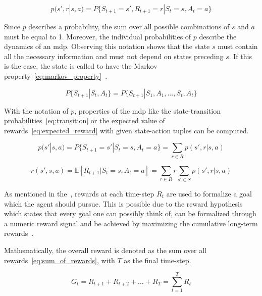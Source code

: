 \documentclass[draft,final]{vutinfth} %
\newcommand{\p}[1]{see p. #1}
\begin{document}
    \begin{equation}
        p(s',r|s,a) = P\{S_{t+1}=s', R_{t+1}=r | S_t=s, A_t=a\}\label{eq:distribution}
    \end{equation}

    Since $p$ describes a probability, the sum over all possible combinations of $s$ and $a$ must be equal to 1.
    Moreover, the individual probabilities of $p$ describe the dynamics of an \gls{mdp}.
    Observing this notation shows that the state $s$ must contain all the necessary information and must not depend on states preceding $s$.
    If this is the case, the state is called to have the Markov property~\eqref{eq:markov_property}~\citep{francois-lavet_introduction_2018}.

    \begin{equation}
        P\{S_{t+1}|S_t,A_t\} = P\{S_{t+1}|S_1,A_1,\ldots,S_t,A_t\} \label{eq:markov_property}
    \end{equation}

    With the notation of $p$, properties of the \gls{mdp} like the state-transition probabilities~\eqref{eq:transition} or the expected value of rewards~\eqref{eq:expected_reward} with given state-action tuples can be computed.

    \begin{equation}
        p(s'|s,a) = P\{S_{t+1}=s'| S_t=s, A_t=a\} = \sum_{r \in \mathit{R}} p(s',r | s,a) \label{eq:transition}
    \end{equation}

    \begin{equation}
        r(s',s,a) = \mathbb{E}[R_{t+1} | S_t=s, A_t=a] = \sum_{r\in \mathit{R}} r \sum_{s' \in \mathit{S}} p(s',r | s,a) \label{eq:expected_reward}
    \end{equation}

    As mentioned in the~, rewards at each time-step $R_t$ are used to formalize a goal which the agent should pursue.
    This is possible due to the reward hypothesis which states that every goal one can possibly think of, can be formalized through a numeric reward signal and be achieved by maximizing the cumulative long-term rewards~\citep[\p{53}]{sutton_reinforcement_2018}.

    Mathematically, the overall reward is denoted as the sum over all rewards~\eqref{eq:sum_of_rewards}, with $T$ as the final time-step.

    \begin{equation}
        G_t=R_{t+1} + R_{t+2}+ \ldots + R_{T}  =\sum_{t=1}^{T} R_{t}\label{eq:sum_of_rewards}
    \end{equation}
\end{document}
